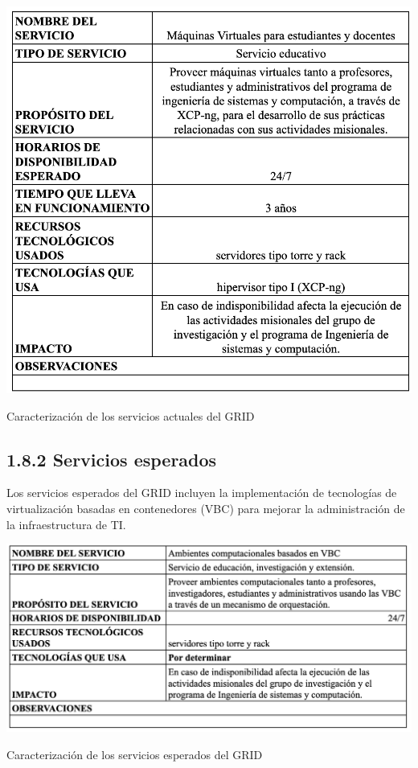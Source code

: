 \begin{table}[H]
    \centering
    \includegraphics[width=\textwidth]{tablas-images/cp1/servicios-actuales/servicios-actuales.png}
    \caption{Caracterización de los servicios actuales del GRID}
    \label{tab:servicios-actuales}
\end{table}

\subsection*{1.8.2 Servicios esperados}
Los servicios esperados del GRID incluyen la implementación de tecnologías de virtualización basadas en contenedores (VBC) para mejorar la administración de la infraestructura de TI.

\begin{table}[H]
    \centering
    \includegraphics[width=\textwidth] {tablas-images/cp1/servicios-esperados/servicios-esperados.png}
    \caption{Caracterización de los servicios esperados del GRID}
    \label{tab:servicios-esperados}
\end{table}


